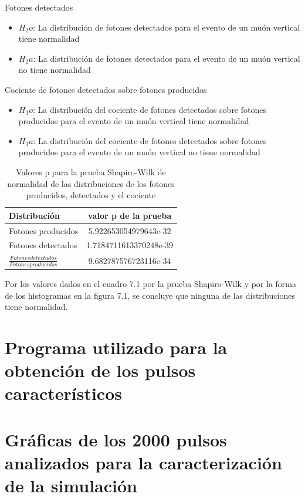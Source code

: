 \documentclass{book}
\begin{document}
Fotones detectados
\begin{itemize}
\item $H_2o$: La distribuci\'on de fotones detectados para el evento de un mu\'on vertical tiene normalidad
\item $H_2a$: La distribuci\'on de fotones detectados para el evento de un mu\'on vertical no tiene normalidad
\end{itemize}

Cociente de fotones detectados sobre fotones producidos
\begin{itemize}
\item $H_3o$: La distribuci\'on del cociente de fotones detectados sobre fotones producidos para el evento de un mu\'on vertical tiene normalidad
\item $H_3a$: La distribuci\'on del cociente de fotones detectados sobre fotones producidos para el evento de un mu\'on vertical no tiene normalidad
\end{itemize}

\begin{table}[h]
\caption{ Valores p para la prueba Shapiro-Wilk de normalidad de las distribuciones de los fotones producidos, detectados y el cociente}
\centering
\begin{tabular}{l | c}
\hline
Distribuci\'on & valor p de la prueba \\ \hline
Fotones producidos & 5.922653054979643e-32 \\
Fotones detectados & 1.7184711613370248e-39 \\
$\frac{Fotones detectados}{Fotones producidos}$ & 9.682787576723116e-34 \\

\hline
\end{tabular}
\end{table}

Por los valores dados en el cuadro 7.1 por la prueba Shapiro-Wilk y por la forma de los histogramas en la figura 7.1, se concluye que ninguna de las distribuciones tiene normalidad.

\section{Programa utilizado para la obtenci\'on de los pulsos caracter\'isticos}



\pagebreak
\section{Gr\'aficas de los 2000 pulsos analizados para la caracterizaci\'on de la simulaci\'on}
\end{document}
